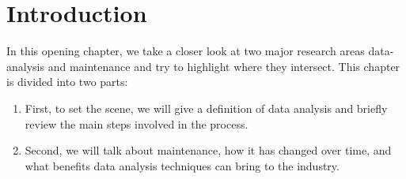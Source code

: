 \chapter{Introduction}\label{chapter:intro}
In this opening chapter, we take a closer look at two major research areas data-analysis and maintenance and try to highlight where they intersect.
This chapter is divided into two parts:
\begin{enumerate}
    \item First, to set the scene, we will give a definition of data analysis and briefly review the main steps involved in the process.
    \item Second, we will talk about maintenance, how it has changed over time, and what benefits data analysis techniques can bring to the industry.
\end{enumerate}





